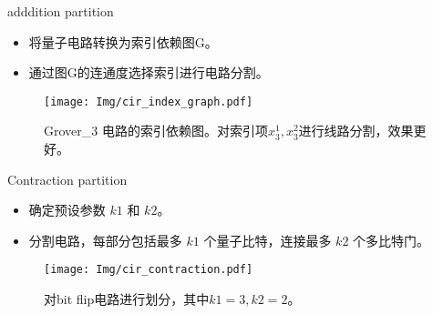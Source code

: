 \documentclass[aspectratio=1610]{ctexbeamer}
\begin{document}
\begin{frame}{adddition partition}
    \begin{itemize}
        \item 将量子电路转换为索引依赖图G。
        \item 通过图G的连通度选择索引进行电路分割。
    \end{itemize}
    \begin{figure}
        \centering
        \texttt{[image: Img/cir\_index\_graph.pdf]}
        \caption{Grover\_3 电路的索引依赖图。对索引项$x_3^1,x_3^2$进行线路分割，效果更好。}
    \end{figure}
\end{frame}
\begin{frame}{Contraction partition}
    \begin{itemize}
        \item 确定预设参数 $k1$ 和 $k2$。
        \item 分割电路，每部分包括最多 $k1$ 个量子比特，连接最多 $k2$ 个多比特门。
    \end{itemize}
    \begin{figure}
        \centering
        \texttt{[image: Img/cir\_contraction.pdf]}
        \caption{对bit flip电路进行划分，其中$k1=3,k2=2$。}
    \end{figure}
\end{frame}
\end{document}
